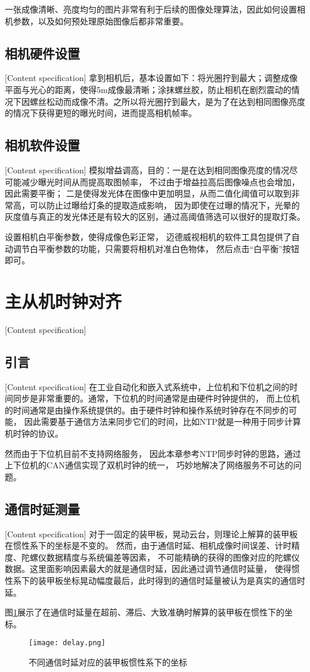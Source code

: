 一张成像清晰、亮度均匀的图片非常有利于后续的图像处理算法，因此如何设置相机参数，以及如何预处理原始图像后都非常重要。
\subsection{相机硬件设置}[Content specification]
拿到相机后，基本设置如下：将光圈拧到最大；调整成像平面与光心的距离，使得5m成像最清晰；涂抹螺丝胶，防止相机在剧烈震动的情况下因螺丝松动而成像不清。之所以将光圈拧到最大，是为了在达到相同图像亮度的情况下获得更短的曝光时间，进而提高相机帧率。
\subsection{相机软件设置}[Content specification]
模拟增益调高，目的：一是在达到相同图像亮度的情况尽可能减少曝光时间从而提高取图帧率，
不过由于增益拉高后图像噪点也会增加，因此需要平衡； 
二是使得发光体在图像中更加明显，从而二值化阈值可以取到非常高，可以防止过曝给灯条的提取造成影响，
因为即使在过曝的情况下，光晕的灰度值与真正的发光体还是有较大的区别，通过高阈值筛选可以很好的提取灯条。

设置相机白平衡参数，使得成像色彩正常，
迈德威视相机的软件工具包提供了自动调节白平衡参数的功能，只需要将相机对准白色物体，
然后点击“白平衡”按钮即可。




\section{主从机时钟对齐}[Content specification]


\subsection{引言}[Content specification]
在工业自动化和嵌入式系统中，上位机和下位机之间的时间同步是非常重要的。通常，下位机的时间通常是由硬件时钟提供的，
而上位机的时间通常是由操作系统提供的。由于硬件时钟和操作系统时钟存在不同步的可能，
因此需要基于通信方法来同步它们的时间，比如NTP\cite{sommars2022client}就是一种用于同步计算机时钟的协议。
\par

然而由于下位机目前不支持网络服务，
因此本章参考NTP同步时钟的思路，通过上下位机的CAN通信实现了双机时钟的统一，
巧妙地解决了网络服务不可达的问题。

\subsection{通信时延测量}[Content specification]
对于一固定的装甲板，晃动云台，则理论上解算的装甲板在惯性系下的坐标是不变的。
然而，由于通信时延、相机成像时间误差、计时精度、陀螺仪数据精度与系统偏差等因素，
不可能精确的获得的图像对应的陀螺仪数据。这里面影响因素最大的就是通信时延，因此通过调节通信时延量，
使得惯性系下的装甲板坐标晃动幅度最后，此时得到的通信时延量被认为是真实的通信时延。
\par
图\ref{delay}展示了在通信时延量在超前、滞后、大致准确时解算的装甲板在惯性下的坐标。
\begin{figure}[H]
    \centering
    \texttt{[image: delay.png]} 
    \caption{不同通信时延对应的装甲板惯性系下的坐标} 
    \label{delay}
\end{figure}

